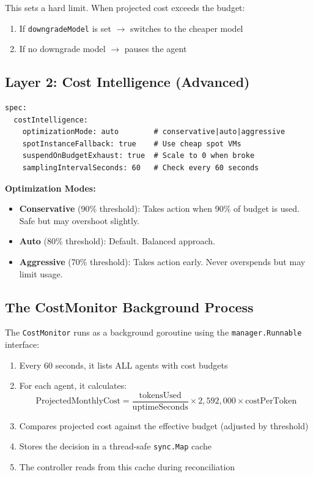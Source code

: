 \documentclass[12pt,a4paper,openany]{report}
\begin{document}
This sets a hard limit. When projected cost exceeds the budget:
\begin{enumerate}
    \item If \texttt{downgradeModel} is set $\rightarrow$ switches to the cheaper model
    \item If no downgrade model $\rightarrow$ pauses the agent
\end{enumerate}

\subsection{Layer 2: Cost Intelligence (Advanced)}

\begin{lstlisting}[style=yaml, caption={Advanced cost intelligence}]
spec:
  costIntelligence:
    optimizationMode: auto        # conservative|auto|aggressive
    spotInstanceFallback: true    # Use cheap spot VMs
    suspendOnBudgetExhaust: true  # Scale to 0 when broke
    samplingIntervalSeconds: 60   # Check every 60 seconds
\end{lstlisting}

\textbf{Optimization Modes:}
\begin{itemize}
    \item \textbf{Conservative} (90\% threshold): Takes action when 90\% of budget is used. Safe but may overshoot slightly.
    \item \textbf{Auto} (80\% threshold): Default. Balanced approach.
    \item \textbf{Aggressive} (70\% threshold): Takes action early. Never overspends but may limit usage.
\end{itemize}

\subsection{The CostMonitor Background Process}

The \texttt{CostMonitor} runs as a background goroutine using the \texttt{manager.Runnable} interface:

\begin{enumerate}
    \item Every 60 seconds, it lists ALL agents with cost budgets
    \item For each agent, it calculates: $$\text{ProjectedMonthlyCost} = \frac{\text{tokensUsed}}{\text{uptimeSeconds}} \times 2{,}592{,}000 \times \text{costPerToken}$$
    \item Compares projected cost against the effective budget (adjusted by threshold)
    \item Stores the decision in a thread-safe \texttt{sync.Map} cache
    \item The controller reads from this cache during reconciliation
\end{enumerate}
\end{document}
